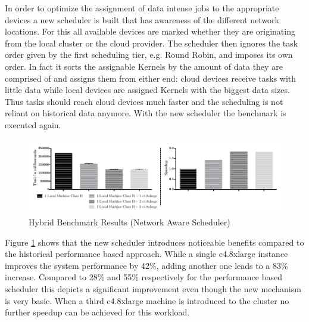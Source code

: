 In order to optimize the assignment of data intense jobs to the appropriate devices a new scheduler is built that has awareness of the different network locations. For this all available devices are marked whether they are originating from the local cluster or the cloud provider. The scheduler then ignores the task order given by the first scheduling tier, e.g. Round Robin, and imposes its own order. In fact it sorts the assignable Kernels by the amount of data they are comprised of and assigns them from either end: cloud devices receive tasks with little data while local devices are assigned Kernels with the biggest data sizes. Thus tasks should reach cloud devices much faster and the scheduling is not reliant on historical data anymore. With the new scheduler the benchmark is executed again.

\begin{figure}[H]	
	\includegraphics[width=1.0\textwidth]{images/hybrid_full_benchmark_network_based.pdf}
	\centering
	\caption{Hybrid Benchmark Results (Network Aware Scheduler)}
	\label{img:hybrid_benchmark_results_network_aware}
\end{figure}

Figure \ref{img:hybrid_benchmark_results_network_aware} shows that the new scheduler introduces noticeable benefits compared to the historical performance based approach. While a single c4.8xlarge instance improves the system performance by 42\%, adding another one leads to a 83\% increase. Compared to 28\% and 55\% respectively for the performance based scheduler this depicts a significant improvement even though the new mechanism is very basic. When a third c4.8xlarge machine is introduced to the cluster no further speedup can be achieved for this workload.

